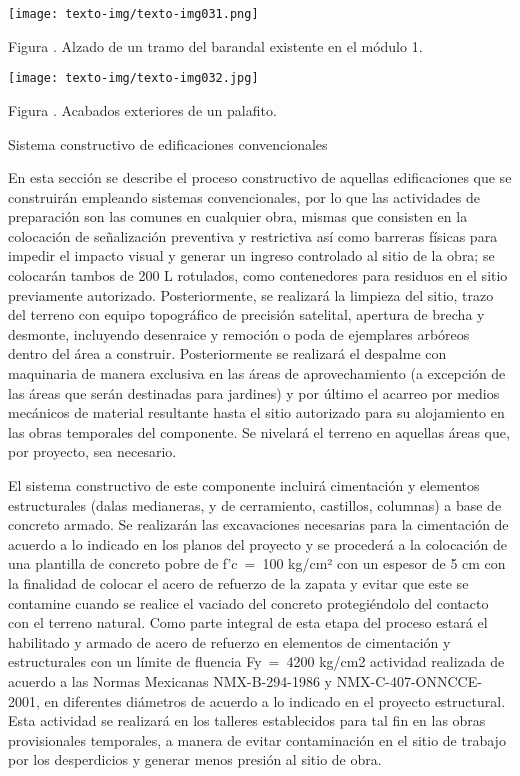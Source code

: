 \documentclass{article}
\newcounter{Figura}
\renewcommand\theFigura{\arabic{Figura}}
\begin{document}
\bigskip

 \texttt{[image: texto-img/texto-img031.png]} 

Figura \stepcounter{Figura}{\theFigura}. Alzado de un tramo del barandal existente en el módulo 1.


\bigskip

 \texttt{[image: texto-img/texto-img032.jpg]} 

Figura \stepcounter{Figura}{\theFigura}. Acabados exteriores de un palafito.


\bigskip


\bigskip

Sistema constructivo de edificaciones convencionales


\bigskip

En esta sección se describe el proceso constructivo de aquellas edificaciones que se construirán empleando sistemas convencionales, por lo que las actividades de preparación son las comunes en cualquier obra, mismas que consisten en la colocación de señalización preventiva y restrictiva así como barreras físicas para impedir el impacto visual y generar un ingreso controlado al sitio de la obra; se colocarán tambos de 200 L rotulados, como contenedores para residuos en el sitio previamente autorizado. Posteriormente, se realizará la limpieza del sitio, trazo del terreno con equipo topográfico de precisión satelital, apertura de brecha y desmonte, incluyendo desenraice y remoción o poda de ejemplares arbóreos dentro del área a construir. Posteriormente se realizará el despalme con maquinaria de manera exclusiva en las áreas de aprovechamiento (a excepción de las áreas que serán destinadas para jardines) y por último el acarreo por medios mecánicos de material resultante hasta el sitio autorizado para su alojamiento en las obras temporales del componente. Se nivelará el terreno en aquellas áreas que, por proyecto, sea necesario.


\bigskip

El sistema constructivo de este componente incluirá cimentación y elementos estructurales (dalas medianeras, y de cerramiento, castillos, columnas) a base de concreto armado. Se realizarán las excavaciones necesarias para la cimentación de acuerdo a lo indicado en los planos del proyecto y se procederá a la colocación de una plantilla de concreto pobre de f’c~=~100 kg/cm² con un espesor de 5 cm con la finalidad de colocar el acero de refuerzo de la zapata y evitar que este se contamine cuando se realice el vaciado del concreto protegiéndolo del contacto con el terreno natural. Como parte integral de esta etapa del proceso estará el habilitado y armado de acero de refuerzo en elementos de cimentación y estructurales con un límite de fluencia Fy~=~4200 kg/cm2 actividad realizada de acuerdo a las Normas Mexicanas NMX-B-294-1986 y NMX-C-407-ONNCCE-2001, en diferentes diámetros de acuerdo a lo indicado en el proyecto estructural. Esta actividad se realizará en los talleres establecidos para tal fin en las obras provisionales temporales, a manera de evitar contaminación en el sitio de trabajo por los desperdicios y generar menos presión al sitio de obra.
\end{document}
